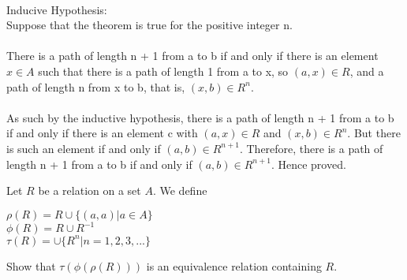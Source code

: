 \documentclass[addpoints]{exam}
\begin{document}
\begin{questions}
  \begin{solution}
    \\Inducive Hypothesis:
    \\Suppose that the theorem is true for the positive integer n.
    \\
    \\ There is a path of length n + 1 from a to b if and only if there is an element $x \in A$ such that
    there is a path of length 1 from a to x, so $(a, x) \in R$, and a path of length n from x to b,
    that is, $(x, b) ∈ R^n$. 
    \\
    \\As such by the inductive hypothesis, there is a path of length n + 1 from a to b if and only if there is an element c with $(a, x) \in R$ and $(x, b) \in R^n$. But there
    is such an element if and only if $(a, b) \in R^{n+1}$. Therefore, there is a path of length n + 1
    from a to b if and only if $(a, b) \in R^{n+1}$. Hence proved.
    
  \end{solution}

\question
    Let $R$ be a relation on a set $A$. We define

    $\rho (R) = R \cup \{(a, a) | a \in A\}$ \\ 
    $\phi (R) = R \cup R^{-1}$ \\
    $\tau (R) = \cup \{ R^n | n = 1,2,3,...\}$
    
    Show that $\tau (\phi (\rho (R)))$ is an equivalence relation containing $R$.
    

\end{questions}
\end{document}
